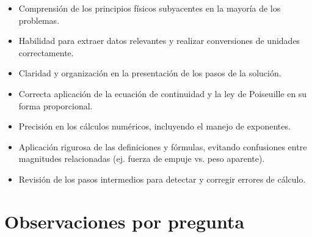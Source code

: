 \documentclass[11pt,a4paper]{article}
\begin{document}
\vspace{4pt}
\begin{minipage}[t]{0.48\linewidth}
  \begin{tcolorbox}[cajaFortaleza, title={Fortalezas}]
\begin{itemize}[leftmargin=1.5em, itemsep=2pt]
  \item Comprensión de los principios físicos subyacentes en la mayoría de los problemas.
  \item Habilidad para extraer datos relevantes y realizar conversiones de unidades correctamente.
  \item Claridad y organización en la presentación de los pasos de la solución.
  \item Correcta aplicación de la ecuación de continuidad y la ley de Poiseuille en su forma proporcional.
\end{itemize}
  \end{tcolorbox}
\end{minipage}
\hfill
\begin{minipage}[t]{0.48\linewidth}
  \begin{tcolorbox}[cajaMejora, title={Areas de mejora}]
\begin{itemize}[leftmargin=1.5em, itemsep=2pt]
  \item Precisión en los cálculos numéricos, incluyendo el manejo de exponentes.
  \item Aplicación rigurosa de las definiciones y fórmulas, evitando confusiones entre magnitudes relacionadas (ej. fuerza de empuje vs. peso aparente).
  \item Revisión de los pasos intermedios para detectar y corregir errores de cálculo.
\end{itemize}
  \end{tcolorbox}
\end{minipage}

\section*{Observaciones por pregunta}
\end{document}
